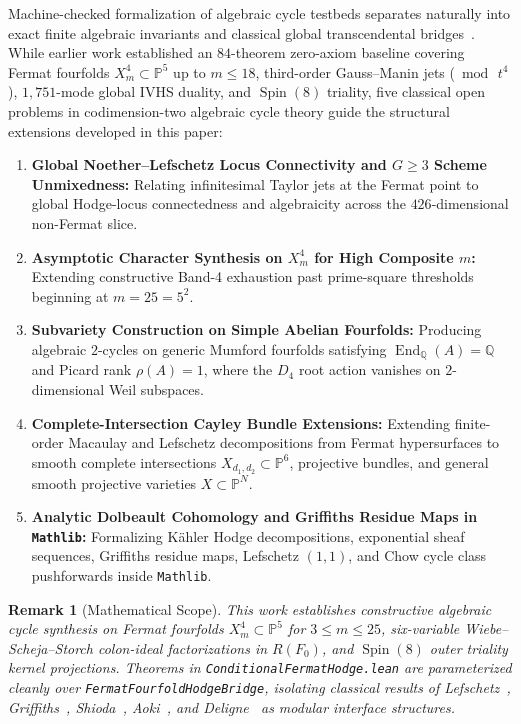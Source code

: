 \documentclass[11pt,a4paper]{article}
\newtheorem{remark}[theorem]{Remark}
\begin{document}
Machine-checked formalization of algebraic cycle testbeds separates naturally into exact finite algebraic invariants and classical global transcendental bridges~\cite{Deligne2000,Shioda1979,Aoki1983}. While earlier work established an $84$-theorem zero-axiom baseline covering Fermat fourfolds $X_m^4 \subset \mathbb{P}^5$ up to $m \le 18$, third-order Gauss--Manin jets ($\bmod\, t^4$), $1{,}751$-mode global IVHS duality, and $\operatorname{Spin}(8)$ triality, five classical open problems in codimension-two algebraic cycle theory guide the structural extensions developed in this paper:
\begin{enumerate}
  \item[(i)] \textbf{Global Noether--Lefschetz Locus Connectivity and $G \ge 3$ Scheme Unmixedness:} Relating infinitesimal Taylor jets at the Fermat point to global Hodge-locus connectedness and algebraicity across the $426$-dimensional non-Fermat slice.
  \item[(ii)] \textbf{Asymptotic Character Synthesis on $X_m^4$ for High Composite $m$:} Extending constructive Band-4 exhaustion past prime-square thresholds beginning at $m = 25 = 5^2$.
  \item[(iii)] \textbf{Subvariety Construction on Simple Abelian Fourfolds:} Producing algebraic $2$-cycles on generic Mumford fourfolds satisfying $\operatorname{End}_{\mathbb{Q}}(A) = \mathbb{Q}$ and Picard rank $\rho(A) = 1$, where the $D_4$ root action vanishes on $2$-dimensional Weil subspaces.
  \item[(iv)] \textbf{Complete-Intersection Cayley Bundle Extensions:} Extending finite-order Macaulay and Lefschetz decompositions from Fermat hypersurfaces to smooth complete intersections $X_{d_1,d_2} \subset \mathbb{P}^6$, projective bundles, and general smooth projective varieties $X \subset \mathbb{P}^N$.
  \item[(v)] \textbf{Analytic Dolbeault Cohomology and Griffiths Residue Maps in \texttt{Mathlib}:} Formalizing K\"ahler Hodge decompositions, exponential sheaf sequences, Griffiths residue maps, Lefschetz $(1,1)$, and Chow cycle class pushforwards inside \texttt{Mathlib}.
\end{enumerate}

\begin{remark}[Mathematical Scope]
This work establishes constructive algebraic cycle synthesis on Fermat fourfolds $X_m^4 \subset \mathbb{P}^5$ for $3 \le m \le 25$, six-variable Wiebe--Scheja--Storch colon-ideal factorizations in $R(F_0)$, and $\operatorname{Spin}(8)$ outer triality kernel projections. Theorems in \texttt{ConditionalFermatHodge.lean} are parameterized cleanly over \texttt{FermatFourfoldHodgeBridge}, isolating classical results of Lefschetz~\cite{Lefschetz1924}, Griffiths~\cite{Griffiths1969}, Shioda~\cite{Shioda1979}, Aoki~\cite{Aoki1983}, and Deligne~\cite{Deligne2000} as modular interface structures.
\end{remark}
\end{document}
